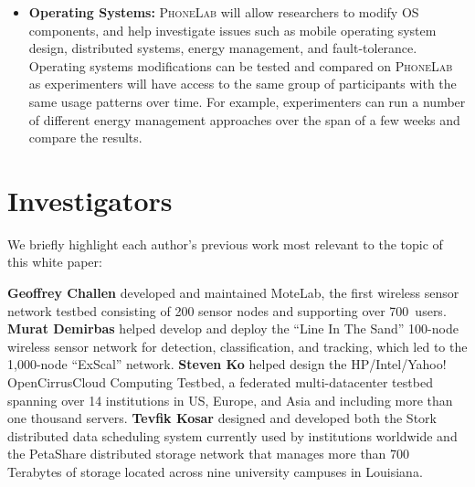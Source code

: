 \begin{itemize}
\item \textbf{Operating Systems:} {\scshape PhoneLab} will allow researchers
to modify OS components, and help investigate issues such as mobile operating
system design, distributed systems, energy management, and fault-tolerance.
Operating systems modifications can be tested and compared on {\scshape
PhoneLab} as experimenters will have access to the same group of participants
with the same usage patterns over time. For example, experimenters can run a
number of different energy management approaches over the span of a few weeks
and compare the results.

\end{itemize}

\section{Investigators}

We briefly highlight each author's previous work most relevant to the topic
of this white paper:

\textbf{Geoffrey Challen} developed and maintained MoteLab, the first
wireless sensor network testbed consisting of 200 sensor nodes and supporting
over 700~users. \textbf{Murat Demirbas} helped develop and deploy the ``Line
In The Sand'' 100-node wireless sensor network for detection, classification,
and tracking, which led to the 1,000-node ``ExScal'' network. \textbf{Steven
Ko} helped design the HP/Intel/Yahoo! OpenCirrus\texttrademark \space Cloud Computing
Testbed, a federated multi-datacenter testbed spanning over 14 institutions
in US, Europe, and Asia and including more than one thousand servers.
\textbf{Tevfik Kosar} designed and developed both the Stork distributed data
scheduling system currently used by institutions worldwide and the PetaShare
distributed storage network that manages more than 700 Terabytes of storage
located across nine university campuses in Louisiana.


